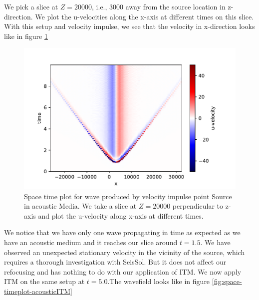 We pick a slice at $Z=20000$, i.e., 3000 away from the source location in z-direction.
We plot the u-velocities along the x-axis at different times on this slice. With this setup and velocity impulse, we see that the velocity in x-direction
looks like in figure \ref{fig:space-timeplot-acousticnoITM}
\begin{figure}
    \centering
    \includegraphics[width=0.75\linewidth]{figures/Acoustic-noITM.pdf}
    \caption{Space time plot for wave produced by velocity impulse point Source in acoustic Media. We take a slice at $Z=20000$ perpendicular to z-axis 
    and plot the u-velocity along x-axis at different times.}
    \label{fig:space-timeplot-acousticnoITM}
\end{figure}

We notice that we have only one wave propagating in time as expected as we have an acoustic medium and it reaches our slice around $t=1.5$. 
We have observed an unexpected stationary velocity in the vicinity of the source, which requires a thorough investigation with SeisSol. But it does not affect our refocusing and has nothing to do with
our application of \ac{ITM}. We now apply ITM on the same setup at $t=5.0$.The wavefield looks like in figure \ref{fig:space-timeplot-acousticITM}


